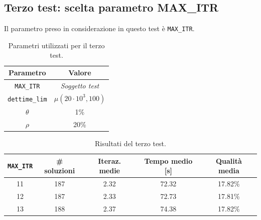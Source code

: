 \subsection{Terzo test: scelta parametro MAX\texorpdfstring{\_}{}ITR}%
\label{sub:Terzo test: scelta parametro MAX-ITR}
Il parametro preso in considerazione in questo test è \verb|MAX_ITR|.

\begin{table}[ht!]
\centering
\begin{tabular}{cc}
\hline
\textbf{Parametro} & \textbf{Valore} \\
\hline
\verb|MAX_ITR| & \emph{Soggetto test}\\
\verb|dettime_lim| & $\mu(20\cdot 10^3,100)$\\
$\theta$ & 1\%\\
$\rho$ & 20\%\\
\hline
\end{tabular}
\caption{Parametri utilizzati per il terzo test.}
\end{table}

\begin{table}[ht!]
\centering
\begin{tabular}{ccccc}
\hline
\verb|MAX_ITR| & \textbf{\# soluzioni} & \textbf{Iteraz. medie} & \textbf{Tempo medio} [s] & \textbf{Qualità media}\\
\hline
11 & 187 & 2.32 & 72.32 & 17.82\% \\
12 & 187 & 2.33 & 72.73 & 17.81\% \\
\rowcolor{lightgray} 13 & 188 & 2.37 & 74.38 & 17.82\% \\
\hline
\end{tabular}
\caption{Risultati del terzo test.}
\end{table}

